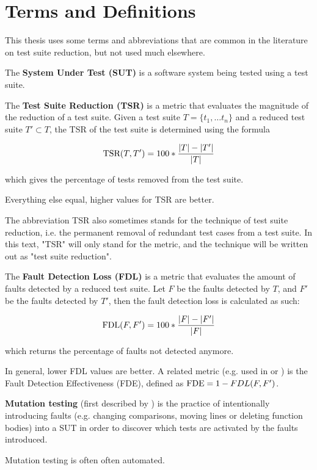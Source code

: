 
\chapter{Terms and Definitions}\label{chapter:terms}

This thesis uses some terms and abbreviations that are common in the
literature on test suite reduction, but not used much elsewhere.

The \textbf{System Under Test (SUT)} is a software system being tested
using a test suite.

The \textbf{Test Suite Reduction (TSR)} is a metric that evaluates the
magnitude of the reduction of a test suite. Given a test suite $T=\{t_1,
\dots t_n\}$ and a reduced test suite $T' \subset T$, the TSR of the
test suite is determined using the formula

$$\hbox{TSR}(T, T')=100*\frac{|T|-|T'|}{|T|}$$

which gives the percentage of tests removed from the test suite.

Everything else equal, higher values for TSR are better.

The abbreviation TSR also sometimes stands for the technique of test
suite reduction, i.e. the permanent removal of redundant test cases
from a test suite. In this text, "TSR" will only stand for the metric,
and the technique will be written out as "test suite reduction".

The \textbf{Fault Detection Loss (FDL)} is a metric that evaluates the
amount of faults detected by a reduced test suite. Let $F$ be the faults
detected by $T$, and $F'$ be the faults detected by $T'$, then the fault
detection loss is calculated as such:

$$\hbox{FDL}(F, F')=100*\frac{|F|-|F'|}{|F|}$$

which returns the percentage of faults not detected anymore.

In general, lower FDL values are better. A related metric (e.g. used in
\cite{khan2016survey} or \cite{yoo2012regression}) is the Fault Detection
Effectiveness (FDE), defined as $\hbox{FDE}=1-FDL(F, F')$.

\textbf{Mutation testing} (first described by \cite{budd1980mutation})
is the practice of intentionally introducing faults (e.g. changing
comparisons, moving lines or deleting function bodies) into a SUT in
order to discover which tests are activated by the faults introduced.

Mutation testing is often often automated.
